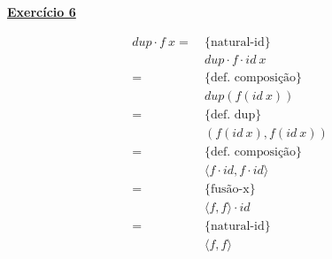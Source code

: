 \documentclass[a4paper,11pt]{article}
\begin{document}
	
	\noindent \underline{\textbf{Exercício 6}}
	\begin{center}
		\begin{minipage}{0.45\textwidth}
			\begin{mdframed}
				\[
				\begin{aligned}
					dup \cdot f \  x
					= \  &\{\text{natural-id}\} \\
					&dup \cdot f \cdot id \  x \\
					= \  &\{\text{def. composição}\} \\
					&dup(f(id \  x)) \\
					= \  &\{\text{def. dup}\} \\
					&( f(id \  x), f(id \  x) ) \\
					= \  &\{\text{def. composição}\} \\
					&\langle f \cdot id, f \cdot id \rangle \\
					= \  &\{\text{fusão-x}\} \\
					&\langle f , f \rangle \cdot id \\
					= \  &\{\text{natural-id}\} \\
					&\langle f , f \rangle
				\end{aligned}
				\]
			\end{mdframed}
		\end{minipage}
	\end{center}
	
\end{document}
